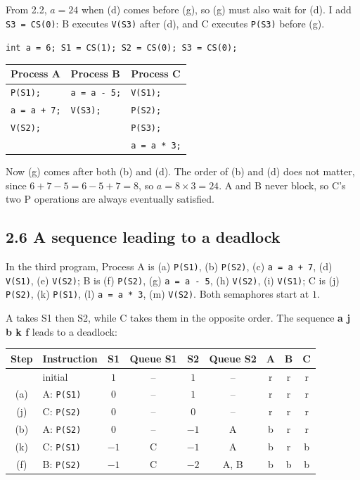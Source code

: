 \documentclass[letterpaper, 11pt]{article}
\newcommand{\1}{\mathds{1}}	%
\theoremstyle{definition}
\begin{document}
From 2.2, $a = 24$ when (d) comes before (g), so (g) must also wait for (d). I add \texttt{S3 = CS(0)}: B executes \texttt{V(S3)} after (d), and C executes \texttt{P(S3)} before (g).

\begin{center}
\texttt{int a = 6; S1 = CS(1); S2 = CS(0); S3 = CS(0);}

\smallskip
\begin{tabular}{lll}
\toprule
Process A & Process B & Process C \\
\midrule
\texttt{P(S1);}      & \texttt{a = a - 5;}  & \texttt{V(S1);} \\
\texttt{a = a + 7;}  & \texttt{V(S3);}      & \texttt{P(S2);} \\
\texttt{V(S2);}      &                      & \texttt{P(S3);} \\
                     &                      & \texttt{a = a * 3;} \\
\bottomrule
\end{tabular}
\end{center}

Now (g) comes after both (b) and (d). The order of (b) and (d) does not matter, since $6 + 7 - 5 = 6 - 5 + 7 = 8$, so $a = 8 \times 3 = 24$. A and B never block, so C's two P operations are always eventually satisfied.

\subsection*{2.6 A sequence leading to a deadlock}

In the third program, Process A is (a) \texttt{P(S1)}, (b) \texttt{P(S2)}, (c) \texttt{a = a + 7}, (d) \texttt{V(S1)}, (e) \texttt{V(S2)}; B is (f) \texttt{P(S2)}, (g) \texttt{a = a - 5}, (h) \texttt{V(S2)}, (i) \texttt{V(S1)}; C is (j) \texttt{P(S2)}, (k) \texttt{P(S1)}, (l) \texttt{a = a * 3}, (m) \texttt{V(S2)}. Both semaphores start at $1$.

A takes S1 then S2, while C takes them in the opposite order. The sequence \textbf{a j b k f} leads to a deadlock:

\begin{center}
\begin{tabular}{clccccccc}
\toprule
Step & Instruction & S1 & Queue S1 & S2 & Queue S2 & A & B & C \\
\midrule
     & initial         & $1$  & -- & $1$  & --   & r & r & r \\
(a)  & A: \texttt{P(S1)} & $0$  & -- & $1$  & --   & r & r & r \\
(j)  & C: \texttt{P(S2)} & $0$  & -- & $0$  & --   & r & r & r \\
(b)  & A: \texttt{P(S2)} & $0$  & -- & $-1$ & A    & b & r & r \\
(k)  & C: \texttt{P(S1)} & $-1$ & C  & $-1$ & A    & b & r & b \\
(f)  & B: \texttt{P(S2)} & $-1$ & C  & $-2$ & A, B & b & b & b \\
\bottomrule
\end{tabular}
\end{center}
\end{document}

